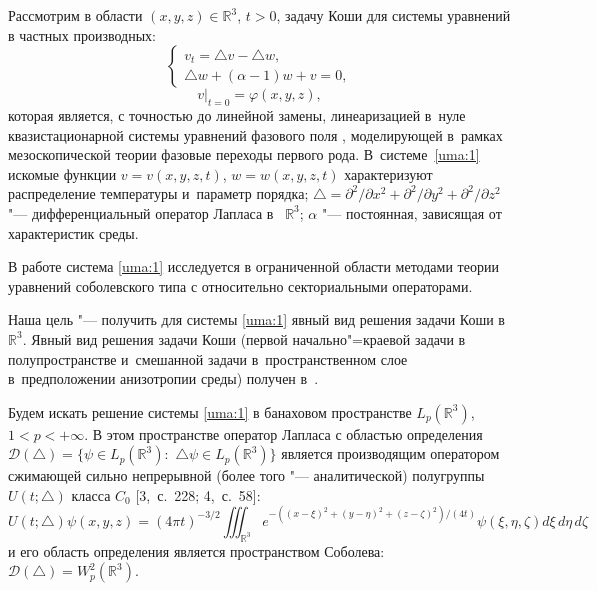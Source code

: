 
\date{30/VI/2011} %



\maketitle

\small

Рассмотрим в области $(x, y, z)\in \mathbb R^3$, $t>0$, задачу Коши для системы уравнений в частных производных:
\begin{equation}
\begin{cases}
v_t=\triangle{v}-\triangle{w}, %
\\
\triangle{w}+(\alpha-1)w+v=0,
\end{cases}
\label{uma:1}
\end{equation}
\begin{equation}
v|_{t=0}=\varphi(x,y,z),
\label{uma:2}
\end{equation}
которая является, с точностью до линейной замены, линеаризацией в~нуле квазистационарной системы уравнений фазового поля \cite[с. 24]{umarov:bib:Zagrebina}, моделирующей в~рамках мезоскопической теории фазовые переходы первого рода. 
В~системе~\eqref{uma:1} искомые функции $v=v(x,y,z,t)$, $w=w(x,y,z,t)$ характеризуют распределение температуры и~параметр порядка; 
$\triangle=\partial^2/\partial{x}^2+\partial^2/\partial{y}^2+\partial^2/\partial{z}^2$ "--- дифференциальный оператор Лапласа в~ $\mathbb R^3$; $\alpha$ "--- постоянная, зависящая от характеристик среды.

В работе \cite{umarov:bib:Zagrebina} система \eqref{uma:1} исследуется в ограниченной области методами теории уравнений соболевского типа с относительно секториальными операторами.

Наша цель "--- получить для системы \eqref{uma:1} явный вид решения задачи Коши  в $\mathbb R^3$.
Явный вид решения задачи Коши (первой начально"=краевой задачи в полупространстве и~смешанной задачи в~пространственном слое в~предположении анизотропии среды) получен в~\cite{umarov:bib:Umarov}.

Будем искать решение системы \eqref{uma:1} в банаховом пространстве $L_p(\mathbb R^3)$,  \mbox{$1<p<+\infty$}. В этом пространстве оператор Лапласа с областью определения \mbox{$\mathcal{D}(\triangle)=\{\psi\in L_p(\mathbb R^3): $} $ \triangle\psi\in L_p(\mathbb R^3)\}$ является производящим оператором сжимающей сильно непрерывной (более того "--- аналитической) полугруппы $U(t;\triangle)$ класса $C_0$  [3,~с.~228; 4,~с.~58]:
\begin{equation}
U(t;\triangle)\psi(x,y,z)=(4\pi{t})^{-3/2}%
\iiint_{\mathbb R^3}e^{-\left((x-\xi)^2+(y-\eta)^2 + (z-\zeta)^2\right)/(4t)}\psi(\xi,\eta,\zeta)d\xi\,d\eta\,d\zeta
\label{uma:3}
\end{equation}
и его область определения является пространством Соболева:  $\mathcal{D}(\triangle)=W_p^2(\mathbb R^3)$.


